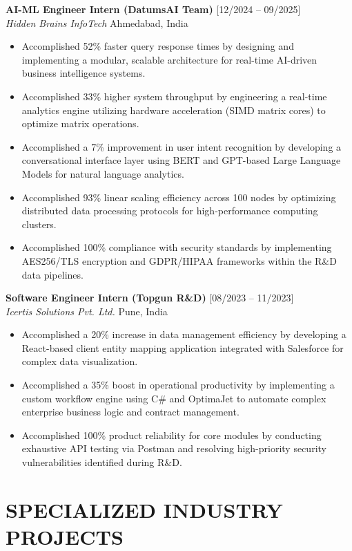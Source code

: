 \documentclass[a4paper,10pt]{article}
\begin{document}
\vspace{4pt}
\noindent
\textbf{AI-ML Engineer Intern (DatumsAI Team)} \hfill [12/2024 – 09/2025] \\
\textit{Hidden Brains InfoTech} \hfill Ahmedabad, India
\begin{itemize}
    \item Accomplished 52\% faster query response times by designing and implementing a modular, scalable architecture for real-time AI-driven business intelligence systems.
    \item Accomplished 33\% higher system throughput by engineering a real-time analytics engine utilizing hardware acceleration (SIMD matrix cores) to optimize matrix operations.
    \item Accomplished a 7\% improvement in user intent recognition by developing a conversational interface layer using BERT and GPT-based Large Language Models for natural language analytics.
    \item Accomplished 93\% linear scaling efficiency across 100 nodes by optimizing distributed data processing protocols for high-performance computing clusters.
    \item Accomplished 100\% compliance with security standards by implementing AES256/TLS encryption and GDPR/HIPAA frameworks within the R\&D data pipelines.
\end{itemize}

\vspace{4pt}
\noindent
\textbf{Software Engineer Intern (Topgun R\&D)} \hfill [08/2023 – 11/2023] \\
\textit{Icertis Solutions Pvt. Ltd.} \hfill Pune, India
\begin{itemize}
    \item Accomplished a 20\% increase in data management efficiency by developing a React-based client entity mapping application integrated with Salesforce for complex data visualization.
    \item Accomplished a 35\% boost in operational productivity by implementing a custom workflow engine using C\# and OptimaJet to automate complex enterprise business logic and contract management.
    \item Accomplished 100\% product reliability for core modules by conducting exhaustive API testing via Postman and resolving high-priority security vulnerabilities identified during R\&D.
\end{itemize}

\section{SPECIALIZED INDUSTRY PROJECTS}
\end{document}
